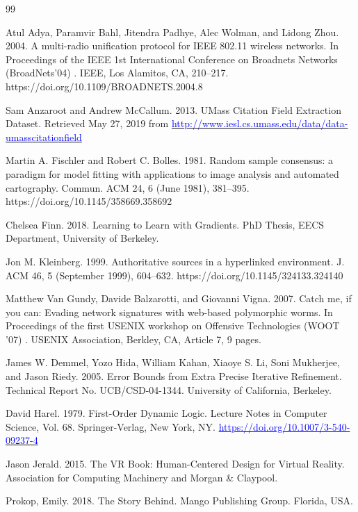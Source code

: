 \documentclass[conference]{IEEEtran}
\begin{document}
\begin{thebibliography}{99}

 Atul Adya, Paramvir Bahl, Jitendra Padhye, Alec Wolman, and Lidong Zhou. 2004. A multi-radio unification protocol for IEEE 802.11 wireless networks. In Proceedings of the IEEE 1st International Conference on Broadnets Networks (BroadNets’04) . IEEE, Los Alamitos, CA, 210–217. https://doi.org/10.1109/BROADNETS.2004.8

 Sam Anzaroot and Andrew McCallum. 2013. UMass Citation Field Extraction Dataset. Retrieved May 27, 2019 from \href{http://www.iesl.cs.umass.edu/data/data-umasscitationfield}{\textcolor{blue}{http://www.iesl.cs.umass.edu/data/data-umasscitationfield}}

 Martin A. Fischler and Robert C. Bolles. 1981. Random sample consensus: a paradigm for model fitting with applications to image analysis and automated cartography. Commun. ACM 24, 6 (June 1981), 381–395. https://doi.org/10.1145/358669.358692

 Chelsea Finn. 2018. Learning to Learn with Gradients. PhD Thesis, EECS Department, University of Berkeley.

 Jon M. Kleinberg. 1999. Authoritative sources in a hyperlinked environment. J. ACM 46, 5 (September 1999), 604–632. https://doi.org/10.1145/324133.324140

 Matthew Van Gundy, Davide Balzarotti, and Giovanni Vigna. 2007. Catch me, if you can: Evading network signatures with web-based polymorphic worms. In Proceedings of the first USENIX workshop on Offensive Technologies (WOOT ’07) . USENIX Association, Berkley, CA, Article 7, 9 pages.

 James W. Demmel, Yozo Hida, William Kahan,  Xiaoye S. Li, Soni Mukherjee, and Jason Riedy. 2005. Error Bounds from Extra Precise Iterative Refinement. Technical Report No. UCB/CSD-04-1344. University of California, Berkeley.

 David Harel. 1979. First-Order Dynamic Logic. Lecture Notes in Computer Science, Vol. 68. Springer-Verlag, New York, NY.  \href{https://doi.org/10.1007/3-540-09237-4}{\textcolor{blue}{https://doi.org/10.1007/3-540-09237-4}}

 Jason Jerald. 2015. The VR Book: Human-Centered Design for Virtual Reality. Association for Computing Machinery and Morgan \& Claypool.

 Prokop, Emily. 2018. The Story Behind. Mango Publishing Group.  Florida, USA.


\end{thebibliography}
\end{document}
